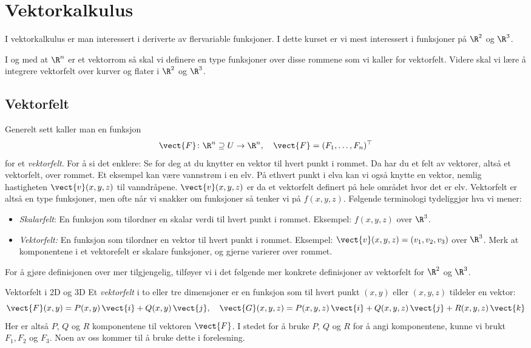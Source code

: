 \chapter{Vektorkalkulus}
\label{chap:VektorKalk}
I vektorkalkulus er man interessert i deriverte av flervariable funksjoner. I dette kurset er vi mest interessert i funksjoner på $\R^2$ og $\R^3$. 

I og med at $\R^n$ er et vektorrom så skal vi definere en type funksjoner over disse rommene som vi kaller for vektorfelt. Videre skal vi lære å integrere vektorfelt over kurver og flater i $\R^2$ og $\R^3$.

\section{Vektorfelt}\label{sect:vektorfelt}
Generelt sett kaller man en funksjon 
\[\vect{F} \colon \R^n \supseteq U \rightarrow \R^n, \quad \vect{F}=(F_1,\ldots, F_n)^\top\] for et \emph{vektorfelt}. 
For å si det enklere: Se for deg at du knytter en vektor til hvert punkt i rommet. Da har du et felt av vektorer, altså et vektorfelt, over rommet. Et eksempel kan være vannstrøm i en elv. På ethvert punkt i elva kan vi også knytte en vektor, nemlig hastigheten $\vect{v}(x,y,z)$ til vanndråpene. $\vect{v}(x,y,z)$ er da et vektorfelt definert på hele området hvor det er elv. Vektorfelt er altså en type funksjoner, men ofte når vi snakker om funksjoner så tenker vi på $f(x,y,z)$. Følgende terminologi tydeliggjør hva vi mener:
\begin{itemize}
    \item \textit{Skalarfelt}: En funksjon som tilordner en skalar verdi til hvert punkt i rommet. Eksempel: $f(x,y,z)$ over $\R^3$.
    \item \textit{Vektorfelt:} En funksjon som tilordner en vektor til hvert punkt i rommet. Eksempel: $\vect{v}(x,y,z)=(v_1,v_2,v_3)$ over $\R^3$. Merk at komponentene i et vektorefelt er skalare funksjoner, og gjerne varierer over rommet.
\end{itemize}

For å gjøre definisjonen over mer tilgjengelig, tilføyer vi i det følgende mer konkrete definisjoner av vektorfelt for $\R^2$ og $\R^3$.

\begin{defn}{Vektorfelt i 2D og 3D}
Et \emph{vektorfelt} i to eller tre dimensjoner er en funksjon som til hvert punkt $(x, y)$ eller $(x, y, z)$ tildeler en vektor:
\[
\vect{F}(x, y) = P(x, y)\,\vect{i} + Q(x, y)\,\vect{j}, \quad
\vect{G}(x, y, z) = P(x, y, z)\,\vect{i} + Q(x, y, z)\,\vect{j} + R(x, y, z)\,\vect{k}
\]
Her er altså $P$, $Q$ og $R$ komponentene til vektoren $\vect{F}$. I stedet for å bruke $P$, $Q$ og $R$ for å angi komponentene, kunne vi brukt $F_1,F_2$ og $F_3$. Noen av oss kommer til å bruke dette i forelesning.
\end{defn}

